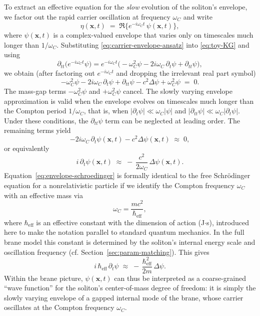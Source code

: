 To extract an effective equation for the \emph{slow} evolution of the
soliton's envelope, we factor out the rapid carrier oscillation at
frequency $\omega_C$ and write
\begin{equation}
  \eta(\mathbf x,t)
  \;=\;
  \Re\!\big\{e^{-i\omega_C t}\,\psi(\mathbf x,t)\big\},
  \label{eq:carrier-envelope-ansatz}
\end{equation}
where $\psi(\mathbf x,t)$ is a complex-valued envelope that varies only
on timescales much longer than $1/\omega_C$. Substituting
\eqref{eq:carrier-envelope-ansatz} into \eqref{eq:toy-KG} and using
\[
  \partial_{tt}\big(e^{-i\omega_C t}\psi\big)
  =
  e^{-i\omega_C t}\big(
    -\omega_C^2\psi
    -2i\omega_C\,\partial_t\psi
    +\partial_{tt}\psi
  \big),
\]
we obtain (after factoring out $e^{-i\omega_C t}$ and dropping the
irrelevant real part symbol)
\begin{equation}
  -\omega_C^2\psi
  -2i\omega_C\,\partial_t\psi
  +\partial_{tt}\psi
  -c^2\Delta\psi
  +\omega_C^2\psi
  \;=\; 0.
\end{equation}
The mass-gap terms $-\omega_C^2\psi$ and $+\omega_C^2\psi$ cancel.
The slowly varying envelope approximation is valid when the envelope
evolves on timescales much longer than the Compton period $1/\omega_C$,
that is, when
$|\partial_t\psi|\ll \omega_C|\psi|$ and
$|\partial_{tt}\psi|\ll \omega_C|\partial_t\psi|$.
Under these conditions, the
$\partial_{tt}\psi$ term can be neglected at leading order. The
remaining terms yield
\begin{equation}
  -2i\omega_C\,\partial_t\psi(\mathbf x,t)
  -c^2\Delta\psi(\mathbf x,t)
  \;\approx\; 0,
\end{equation}
or equivalently
\begin{equation}
  i\,\partial_t\psi(\mathbf x,t)
  \;\approx\;
  -\,\frac{c^2}{2\omega_C}\,\Delta\psi(\mathbf x,t).
  \label{eq:envelope-schroedinger}
\end{equation}
Equation~\eqref{eq:envelope-schroedinger} is formally identical to the
free Schrödinger equation for a nonrelativistic particle if we identify
the Compton frequency $\omega_C$ with an effective mass via
\begin{equation}
  \omega_C = \frac{m c^2}{\hbar_\text{eff}},
\end{equation}
where $\hbar_\text{eff}$ is an effective constant with the dimension
of action (J$\cdot$s), introduced here to make the notation parallel
to standard quantum mechanics. In the full brane model this constant
is determined by the soliton's internal energy scale and oscillation
frequency (cf. Section~\ref{sec:param-matching}).
This gives
\begin{equation}
  i\,\hbar_\text{eff}\,\partial_t\psi
  \;\approx\;
  -\,\frac{\hbar_\text{eff}^2}{2m}\,\Delta\psi.
  \label{eq:schroedinger-from-envelope}
\end{equation}
Within the brane picture, $\psi(\mathbf x,t)$ can thus be interpreted as
a coarse-grained ``wave function'' for the soliton's center-of-mass
degree of freedom: it is simply the slowly varying envelope of a gapped
internal mode of the brane, whose carrier oscillates at the Compton
frequency $\omega_C$.

